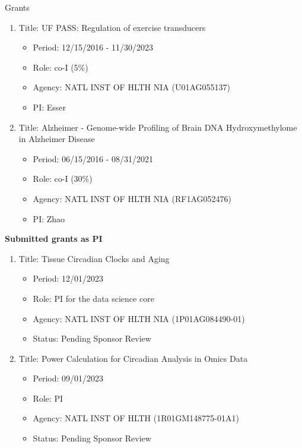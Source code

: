 \documentclass{resume} %
\begin{document}
\begin{rSection}{Grants}
\begin{enumerate}[noitemsep,topsep=0pt]
\item Title: UF PASS: Regulation of exercise transducers
\begin{itemize}[noitemsep,topsep=0pt,leftmargin=*]
\item[] Period: 12/15/2016 - 11/30/2023
\item[] Role: co-I (5\%)
\item[] Agency: NATL INST OF HLTH NIA (U01AG055137)
\item[] PI: Esser
\end{itemize}

\item Title: Alzheimer -  Genome-wide Profiling of Brain DNA Hydroxymethylome in Alzheimer Disease
\begin{itemize}[noitemsep,topsep=0pt,leftmargin=*]
\item[] Period: 06/15/2016 - 08/31/2021
\item[] Role: co-I (30\%)
\item[] Agency: NATL INST OF HLTH NIA (RF1AG052476)
\item[] PI: Zhao
\end{itemize}
\end{enumerate}




\textbf{Submitted grants as PI}


\begin{enumerate}[noitemsep,topsep=0pt]
\item Title: Tissue Circadian Clocks and Aging
\begin{itemize}[noitemsep,topsep=0pt,leftmargin=*]
\item[] Period: 12/01/2023
\item[] Role: PI for the data science core
\item[] Agency: NATL INST OF HLTH NIA (1P01AG084490-01)
\item[] Status:  Pending Sponsor Review
\end{itemize}

\item Title: Power Calculation for Circadian Analysis in Omics Data
\begin{itemize}[noitemsep,topsep=0pt,leftmargin=*]
\item[] Period: 09/01/2023
\item[] Role: PI
\item[] Agency: NATL INST OF HLTH (1R01GM148775-01A1)
\item[] Status:  Pending Sponsor Review
\end{itemize}


\end{enumerate}
\end{rSection}
\end{document}
